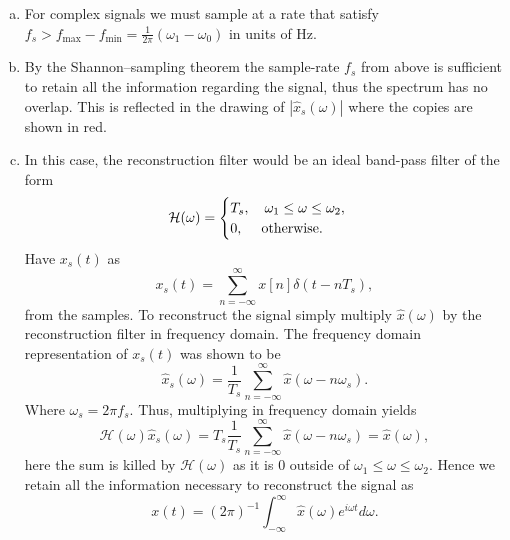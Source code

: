 \begin{enumerate}
\begin{enumerate}[a)]
\item For complex signals we must sample at a rate that satisfy $f_{s}>f_{\text{max}}-f_{\text{min}}=\frac{1}{2\pi}(\omega_{1}-\omega_{0})$ in units of Hz. 

\item By the Shannon–sampling theorem the sample-rate $f_{s}$ from above is sufficient to retain all the information regarding the signal, thus the spectrum has no overlap. This is reflected in the drawing of $|\hat{x}_{s}(\omega)|$ where the copies are shown in red.

\begin{center}
\end{center}

\item In this case, the reconstruction filter would be an ideal band-pass filter of the form
$$\mathcal{H}(\omega)=\begin{cases}
    T_{s}, \quad \omega_{1}\le\omega\le\omega_{2}, \\
    0, \quad \hspace{0.1cm}\text{otherwise}.
\end{cases}$$
Have $x_{s}(t)$ as
$$x_{s}(t)=\sum_{n=-\infty}^{\infty}x[n]\delta(t-nT_{s}),$$
from the samples. To reconstruct the signal simply multiply $\hat{x}(\omega)$ by the reconstruction filter in frequency domain. The frequency domain representation of $x_{s}(t)$ was shown to be
$$\hat{x}_{s}(\omega)=\frac{1}{T_{s}}\sum_{n=-\infty}^{\infty}\hat{x}(\omega-n\omega_{s}).$$
Where $\omega_{s}=2\pi f_{s}$. Thus, multiplying in frequency domain yields
$$\mathcal{H}(\omega)\hat{x}_{s}(\omega)=T_{s}\frac{1}{T_{s}}\sum_{n=-\infty}^{\infty}\hat{x}(\omega-n\omega_{s})=\hat{x}(\omega),$$
here the sum is killed by $\mathcal{H}(\omega)$ as it is $0$ outside of $\omega_{1}\le\omega\le\omega_{2}$. Hence we retain all the information necessary to reconstruct the signal as 
$$x(t)=(2\pi)^{-1}\int_{-\infty}^{\infty}\hat{x}(\omega)e^{i\omega t}d\omega.$$
\end{enumerate}




\end{enumerate}

